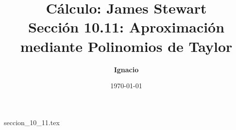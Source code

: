 \documentclass[11pt,spanish,oneside]{report}
\title{\textbf{Cálculo: James Stewart} \\ \Large Sección 10.11: Aproximación mediante Polinomios de Taylor}
\author{\textbf{Ignacio}}
\date{\today}
\begin{document}
\maketitle

{seccion_10_11.tex}
\end{document}
